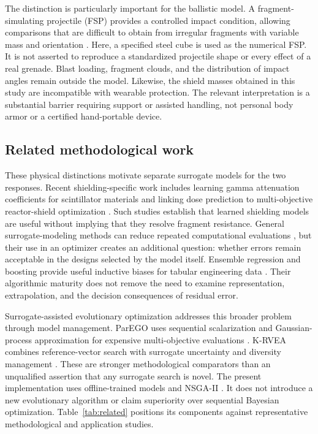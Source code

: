 \documentclass[12pt]{elsarticle}
\begin{document}
The distinction is particularly important for the ballistic model. A fragment-simulating projectile (FSP) provides a controlled impact condition, allowing comparisons that are difficult to obtain from irregular fragments with variable mass and orientation \cite{CantEtAl2015FSP,Hazell2015,Crouch2016}. Here, a specified steel cube is used as the numerical FSP. It is not asserted to reproduce a standardized projectile shape or every effect of a real grenade. Blast loading, fragment clouds, and the distribution of impact angles remain outside the model. Likewise, the shield masses obtained in this study are incompatible with wearable protection. The relevant interpretation is a substantial barrier requiring support or assisted handling, not personal body armor or a certified hand-portable device.

\subsection{Related methodological work}
These physical distinctions motivate separate surrogate models for the two responses. Recent shielding-specific work includes learning gamma attenuation coefficients for scintillator materials \cite{Nahool2024GammaML} and linking dose prediction to multi-objective reactor-shield optimization \cite{Larsen2024Shielding}. Such studies establish that learned shielding models are useful without implying that they resolve fragment resistance. General surrogate-modeling methods can reduce repeated computational evaluations \cite{Forrester2008Surrogate}, but their use in an optimizer creates an additional question: whether errors remain acceptable in the designs selected by the model itself. Ensemble regression and boosting provide useful inductive biases for tabular engineering data \cite{Breiman2001RF,Geurts2006ExtraTrees,Friedman2001GBM,ChenGuestrin2016XGBoost}. Their algorithmic maturity does not remove the need to examine representation, extrapolation, and the decision consequences of residual error.

Surrogate-assisted evolutionary optimization addresses this broader problem through model management. ParEGO uses sequential scalarization and Gaussian-process approximation for expensive multi-objective evaluations \cite{Knowles2006ParEGO}. K-RVEA combines reference-vector search with surrogate uncertainty and diversity management \cite{Chugh2018KRVEA}. These are stronger methodological comparators than an unqualified assertion that any surrogate search is novel. The present implementation uses offline-trained models and NSGA-II \cite{Deb2002NSGAII,Deb2000Constraints}. It does not introduce a new evolutionary algorithm or claim superiority over sequential Bayesian optimization. Table~\ref{tab:related} positions its components against representative methodological and application studies.
\end{document}
